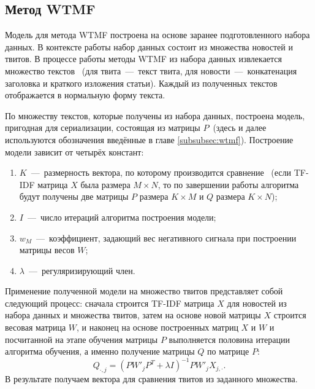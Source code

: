 \subsection{Метод WTMF}
    Модель для метода WTMF построена на основе заранее подготовленного набора данных.
    В контексте работы набор данных состоит из множества новостей и твитов. В процессе работы методы WTMF из набора данных извлекается множество текстов
    ~(для твита~---~текст твита, для новости~---~конкатенация заголовка и краткого изложения статьи).
    Каждый из полученных текстов отображается в нормальную форму текста.

    По множеству текстов, которые получены из набора данных, построена модель, пригодная для сериализации, состоящая из матрицы
    $P$~(здесь и далее используются обозначения введённые в главе \ref{subsubsec:wtmf}).
    Построение модели зависит от четырёх констант:
    \begin{enumerate}
        \item $K$~---~размерность вектора, по которому производится сравнение~
        (если TF-IDF матрица $X$ была размера $M \times N$, то по завершении работы алгоритма будут получены две матрицы $P$ размера $K \times M$ и $Q$ размера $K \times N$);
        \item $I$~---~число итераций алгоритма построения модели;
        \item $w_M$~---~коэффициент, задающий вес негативного сигнала при построении матрицы весов $W$;
        \item $\lambda$~---~регуляризирующий член.
    \end{enumerate}

    Применение полученной модели на множество твитов представляет собой следующий процесс:
    сначала строится TF-IDF матрица $X$ для новостей из набора данных и множества твитов, затем на основе новой матрицы $X$ строится весовая матрица $W$,
    и наконец на основе построенных матриц $X$ и $W$ и посчитанной на этапе обучения матрицы $P$ выполняется половина итерации алгоритма обучения,
    а именно получение матрицы $Q$ по матрице $P$:
    \begin{equation}
        Q_{\cdot, j} = (P W'_j P^T + \lambda I)^{-1} P W'_j X_{j,\cdot}.
    \end{equation}
    В результате получаем вектора для сравнения твитов из заданного множества.